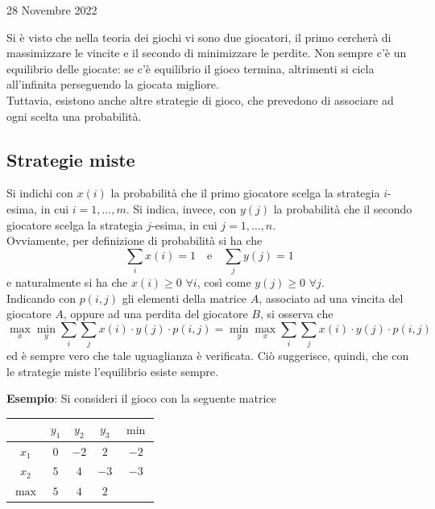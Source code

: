 \documentclass[a4paper]{extarticle}
\renewcommand\arraystretch{}
\begin{document}
\newpage
\begin{center}
    28 Novembre 2022
\end{center}
Si è visto che nella teoria dei giochi vi sono due giocatori, il primo cercherà di massimizzare le vincite e il secondo di minimizzare le perdite. Non sempre c'è un equilibrio delle giocate: se c'è equilibrio il gioco termina, altrimenti si cicla all'infinita perseguendo la giocata migliore.\\
Tuttavia, esistono anche altre strategie di gioco, che prevedono di associare ad ogni scelta una probabilità.

\vspace{1em}
\noindent
\subsection{Strategie miste}
Si indichi con $x(i)$ la probabilità che il primo giocatore scelga la strategia $i$-esima, in cui $i=1,\dots,m$. Si indica, invece, con $y(j)$ la probabilità che il secondo giocatore scelga la strategia $j$-esima, in cui $j=1,\dots,n$.\\
Ovviamente, per definizione di probabilità si ha che
\[\sum_i x(i) = 1 \hspace{1em} \text{e} \hspace{1em} \sum_j y(j) = 1\]
e naturalmente si ha che $x(i) \geq 0$ $\forall i$, così come $y(j) \geq 0$ $\forall j$.\\
Indicando con $p(i,j)$ gli elementi della matrice $A$, associato ad una vincita del giocatore $A$, oppure ad una perdita del giocatore $B$, si osserva che
\[\underset{x}{\max} \underset{y}{\min} \sum_i \sum_j x(i) \cdot y(j) \cdot p(i,j) = \underset{y}{\min} \underset{x}{\max} \sum_i \sum_j x(i) \cdot y(j) \cdot p(i,j)\]
ed è sempre vero che tale uguaglianza è verificata. Ciò suggerisce, quindi, che con le strategie miste l'equilibrio esiste sempre.

\vspace{2em}
\noindent
\textbf{Esempio}: Si consideri il gioco con la seguente matrice

\vspace{1em}
\noindent
\begin{table}[H]
    \setlength{\tabcolsep}{8pt}
    \renewcommand{\arraystretch}{1.5}
    \noindent
    \centering
    \begin{tabular}{|c|ccc|c}
        \hline
         & $y_1$ & $y_2$ & $y_3$ & ${\min}$\\
        \hline
        $x_1$ & $0$ & $-2$ & $2$ & $-2$\\
        $x_2$ & $5$ & $4$ & $-3$ & $-3$\\
        \hline
        ${\max}$ & $5$ & $4$ & $2$
    \end{tabular}
\end{table}
\end{document}

